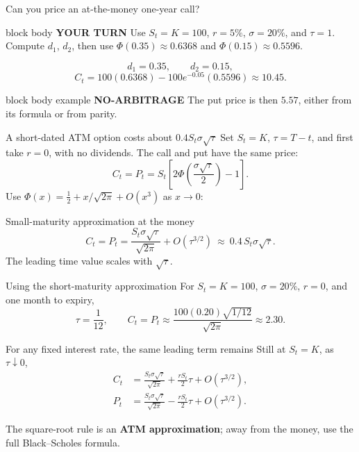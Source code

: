 \documentclass[handout,10pt,aspectratio=169]{beamer}
\newenvironment{marketbox}{\begin{beamercolorbox}[rounded=true,sep=0.7em,wd=\textwidth]{block body example}
  \textbf{\color{CourseGreen}NO-ARBITRAGE}\quad}{\end{beamercolorbox}}
\newenvironment{pausebox}{\begin{beamercolorbox}[rounded=true,sep=0.8em,wd=\textwidth]{block body}
  \textbf{\color{CourseGold}YOUR TURN}\quad}{\end{beamercolorbox}}
\newcommand{\1}{\mathbf 1}
\newcommand{\Ncdf}{\Phi}
\begin{document}
\begin{frame}{Can you price an at-the-money one-year call?}
\begin{pausebox}
Use \(S_t=K=100\), \(r=5\%\), \(\sigma=20\%\), and \(\tau=1\). Compute
\(d_1\), \(d_2\), then use \(\Ncdf(0.35)\approx0.6368\) and
\(\Ncdf(0.15)\approx0.5596\).
\end{pausebox}

\[
d_1=0.35,\qquad d_2=0.15,
\]
\[
C_t=100(0.6368)-100e^{-0.05}(0.5596)
\boxed{\approx10.45.}
\]
\begin{marketbox}
The put price is then \(5.57\), either from its formula or from parity.
\end{marketbox}
\end{frame}

\begin{frame}{A short-dated ATM option costs about \(0.4S_t\sigma\sqrt{\tau}\)}
Set \(S_t=K\), \(\tau=T-t\), and first take \(r=0\), with no dividends.
The call and put have the same price:
\[
C_t=P_t=S_t\left[2\Ncdf\!\left(\frac{\sigma\sqrt{\tau}}{2}\right)-1\right].
\]
Use \(\Ncdf(x)=\tfrac12+x/\sqrt{2\pi}+O(x^3)\) as \(x\to0\):
\begin{block}{Small-maturity approximation at the money}
\[
\boxed{C_t=P_t=\frac{S_t\sigma\sqrt{\tau}}{\sqrt{2\pi}}
       +O(\tau^{3/2})
       \ \approx\ 0.4\,S_t\sigma\sqrt{\tau}.}
\]
The leading time value scales with \(\sqrt{\tau}\).
\end{block}
\end{frame}

\begin{frame}{Using the short-maturity approximation}
For \(S_t=K=100\), \(\sigma=20\%\), \(r=0\), and one month to expiry,
\[
\tau=\frac1{12},\qquad
C_t=P_t\approx\frac{100(0.20)\sqrt{1/12}}{\sqrt{2\pi}}
\approx\boxed{2.30.}
\]
\begin{block}{For any fixed interest rate, the same leading term remains}
Still at \(S_t=K\), as \(\tau\downarrow0\),
\[
\begin{aligned}
C_t&=\frac{S_t\sigma\sqrt{\tau}}{\sqrt{2\pi}}
       +\frac{rS_t}{2}\tau+O(\tau^{3/2}),\\
P_t&=\frac{S_t\sigma\sqrt{\tau}}{\sqrt{2\pi}}
       -\frac{rS_t}{2}\tau+O(\tau^{3/2}).
\end{aligned}
\]
\end{block}
The square-root rule is an \textbf{ATM approximation}; away from the money,
use the full Black--Scholes formula.
\end{frame}
\end{document}
